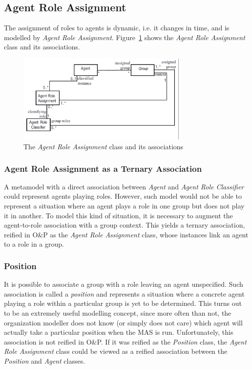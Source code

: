 \subsection{Agent Role Assignment}

The assignment of roles to agents is dynamic, i.e. it changes in time, and is modelled by \textit{Agent Role Assignment}.
Figure~\ref{figure:onp-agent-role-assignment} shows the \textit{Agent Role Assignment} class and its associations.

\begin{figure}[ht]
	\centering
	\includegraphics[width=0.75\textwidth]{images/onp/agent-role-assignment.png}
	\caption{The \textit{Agent Role Assignment} class and its associations}
	\label{figure:onp-agent-role-assignment}
\end{figure}

\subsubsection*{Agent Role Assignment as a Ternary Association}

A metamodel with a direct association between \textit{Agent} and \textit{Agent Role Classifier} could represent agents playing roles.
However, such model would not be able to represent a situation where an agent plays a role in one group but does not play it in another.
To model this kind of situation, it is necessary to augment the agent-to-role association with a group context.
This yields a ternary association, reified in O\&P as the \textit{Agent Role Assignment} class, whose instances link an agent to a role in a group.

\subsubsection*{Position}

It is possible to associate a group with a role leaving an agent unspecified.
Such association is called a \textit{position} and represents a situation where a concrete agent playing a role within a particular group is yet to be determined.
This turns out to be an extremely useful modelling concept, since more often than not, the organization modeller does not know (or simply does not care) which agent will actually take a particular position when the MAS is run.
Unfortunately, this association is not reified in O\&P.
If it was reified as the \textit{Position} class, the \textit{Agent Role Assignment} class could be viewed as a reified association between the \textit{Position} and \textit{Agent} classes.
